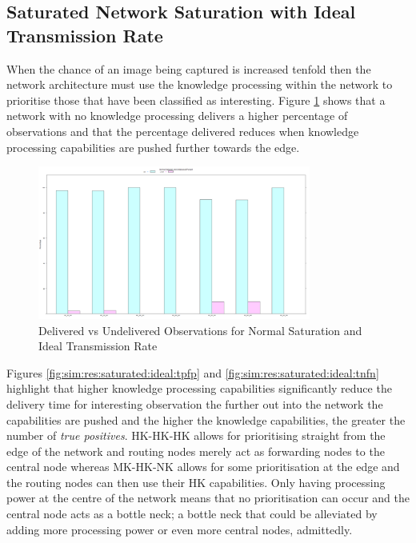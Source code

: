 \subsection{Saturated Network Saturation with Ideal Transmission Rate}

When the chance of an image being captured is increased tenfold then the network architecture must use the knowledge processing within the network to prioritise those that have been classified as interesting. Figure \ref{fig:sim:res:saturated:ideal:delundel} shows that a network with no knowledge processing delivers a higher percentage of observations and that the percentage delivered reduces when knowledge processing capabilities are pushed further towards the edge.

	\begin{figure}[h]
	\centering
	\includegraphics[width=0.8\textwidth]{Chap7/figures/plots/normal_ideal/delvsundel_percent.png}
	\caption{Delivered vs Undelivered Observations for Normal Saturation and Ideal Transmission Rate}
	\label{fig:sim:res:saturated:ideal:delundel}
	\end{figure}

	Figures \ref{fig:sim:res:saturated:ideal:tpfp} and \ref{fig:sim:res:saturated:ideal:tnfn} highlight that higher knowledge processing capabilities significantly reduce the delivery time for interesting observation the further out into the network the capabilities are pushed and the higher the knowledge capabilities, the greater the number of \textit{true positives}. HK-HK-HK allows for prioritising straight from the edge of the network and routing nodes merely act as forwarding nodes to the central node whereas MK-HK-NK allows for some prioritisation at the edge and the routing nodes can then use their HK capabilities. Only having processing power at the centre of the network means that no prioritisation can occur and the central node acts as a bottle neck; a bottle neck that could be alleviated by adding more processing power or even more central nodes, admittedly.

